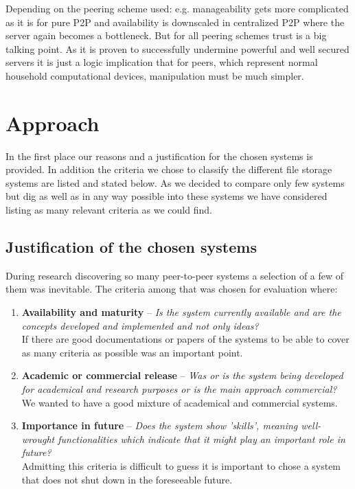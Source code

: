 Depending on the peering scheme used: e.g. manageability gets more complicated as it is for pure P2P and availability is downscaled in centralized P2P where the server again becomes a bottleneck. But for all peering schemes trust is a big talking point. As it is proven to successfully undermine powerful and well secured servers it is just a logic implication that for peers, which represent normal household computational devices, manipulation must be much simpler.

\section{Approach} %
\label{sec:approach}
In the first place our reasons and a justification for the chosen systems is provided. 
In addition the criteria we chose to classify the different file storage systems are listed and stated below. As we decided to compare only few systems but dig as well as in any way possible into these systems we have considered listing as many relevant criteria as we could find.

\subsection{Justification of the chosen systems}
During research discovering so many peer-to-peer systems a selection of a few of them was inevitable. The criteria among that was chosen for evaluation where:
\begin{enumerate}
\item \textbf{Availability and maturity} -- \textit{Is the system currently available and are the concepts developed and implemented and not only ideas?}\\
If there are good documentations or papers of the systems to be able to cover as many criteria as possible was an important point.

\item \textbf{Academic or commercial release} -- \textit{Was or is the system being developed for academical and research purposes or is the main approach commercial?}\\
We wanted to have a good mixture of academical and commercial systems.

\item \textbf{Importance in future} -- \textit{Does the system show 'skills', meaning well-wrought functionalities which indicate that it might play an important role in future?}\\
Admitting this criteria is difficult to guess it is important to chose a system that does not shut down in the foreseeable future.
\end{enumerate}

